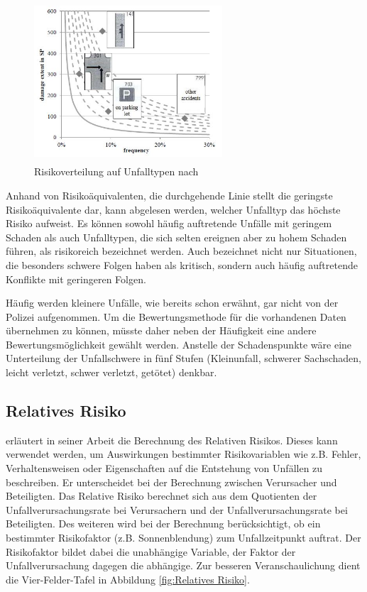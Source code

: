 \begin{savenotes}
	\begin{figure}[H]
		\centering
		\includegraphics[width=7cm,height=6cm]{figures/Risikoverteilung}
		\caption[Risikoverteilung auf Unfalltypen.]{Risikoverteilung auf Unfalltypen nach \parencite[S. 376]{Gschwendtner.2014}}\label{fig:Risikoverteilung}
	\end{figure}
\end{savenotes}


Anhand von Risikoäquivalenten, die durchgehende Linie stellt die geringste Risikoäquivalente dar, kann abgelesen werden, welcher Unfalltyp das höchste Risiko aufweist. Es können sowohl häufig auftretende Unfälle mit geringem Schaden als auch Unfalltypen, die sich selten ereignen aber zu hohem Schaden führen, als risikoreich bezeichnet werden. Auch \Textcite[S. 14]{Mages.2008} bezeichnet nicht nur Situationen, die besonders schwere Folgen haben als kritisch, sondern auch häufig auftretende Konflikte mit geringeren Folgen.

Häufig werden kleinere Unfälle, wie bereits schon erwähnt, gar nicht von der Polizei aufgenommen. Um die Bewertungsmethode für die vorhandenen Daten übernehmen zu können, müsste daher neben der Häufigkeit eine andere Bewertungsmöglichkeit gewählt werden. Anstelle der Schadenspunkte wäre eine Unterteilung der Unfallschwere in fünf Stufen (Kleinunfall, schwerer Sachschaden, leicht verletzt, schwer verletzt, getötet) denkbar.

\subsection{Relatives Risiko}
\Textcite[S. 112f]{Grundl.2005} erläutert in seiner Arbeit die Berechnung des Relativen Risikos. Dieses kann verwendet werden, um Auswirkungen bestimmter Risikovariablen wie z.B. Fehler, Verhaltensweisen oder Eigenschaften auf die Entstehung von Unfällen zu beschreiben. Er unterscheidet bei der Berechnung zwischen Verursacher und Beteiligten. Das Relative Risiko berechnet sich aus dem Quotienten der Unfallverursachungsrate bei Verursachern und der Unfallverursachungsrate bei Beteiligten. %
Des weiteren wird bei der Berechnung berücksichtigt, ob ein bestimmter Risikofaktor (z.B. Sonnenblendung) zum Unfallzeitpunkt auftrat. Der Risikofaktor bildet dabei die unabhängige Variable, der Faktor der Unfallverursachung dagegen die abhängige. Zur besseren Veranschaulichung dient die Vier-Felder-Tafel in Abbildung \ref{fig:Relatives Risiko}. 

